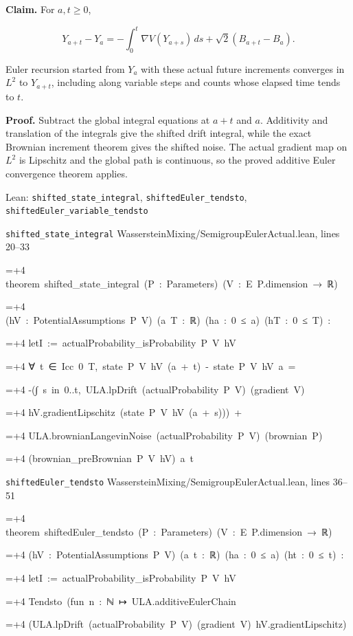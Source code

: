 \documentclass[11pt,a4paper]{report}
\newlength{\leancharwidth}
\newenvironment{leancode}{\par\smallskip\begingroup\ttfamily\footnotesize\raggedright
  \settowidth{\leancharwidth}{M}\setlength{\parskip}{0pt}\setlength{\parindent}{0pt}
  \frenchspacing}{\par\endgroup\smallskip}
\newcommand{\leanline}[2]{\hangindent=\dimexpr#1\leancharwidth+4\leancharwidth\relax
  \hangafter=1\noindent\hspace*{#1\leancharwidth}#2\par}
\newcommand{\leansource}[1]{\par{\footnotesize\color{leanmuted}#1}\par}
\begin{document}
\textbf{Claim.} For \(a,t\ge0\),

\[Y_{a+t}-Y_a=-\int_0^t\nabla V(Y_{a+s})\,ds+\sqrt2(B_{a+t}-B_a).\]

Euler recursion started from \(Y_a\) with these actual future increments converges in \(L^2\) to \(Y_{a+t}\), including along variable steps and counts whose elapsed time tends to \(t\).



\textbf{Proof.} Subtract the global integral equations at \(a+t\) and \(a\). Additivity and translation of the integrals give the shifted drift integral, while the exact Brownian increment theorem gives the shifted noise. The actual gradient map on \(L^2\) is Lipschitz and the global path is continuous, so the proved additive Euler convergence theorem applies.

\begin{leanbox}{Lean: \texttt{shifted\_\allowbreak{}state\_\allowbreak{}integral}, \texttt{shiftedEuler\_\allowbreak{}tendsto}, \texttt{shiftedEuler\_\allowbreak{}variable\_\allowbreak{}tendsto}}
\leansource{\texttt{shifted\_\allowbreak{}state\_\allowbreak{}integral} \quad WassersteinMixing/\allowbreak{}SemigroupEulerActual.lean, lines 20–33}
\begin{leancode}
\leanline{0}{theorem\ shifted\_state\_integral\ (P\ :\ Parameters)\ (V\ :\ E\ P.dimension\ →\ ℝ)}
\leanline{4}{(hV\ :\ PotentialAssumptions\ P\ V)\ (a\ T\ :\ ℝ)\ (ha\ :\ 0\ ≤\ a)\ (hT\ :\ 0\ ≤\ T)\ :}
\leanline{4}{letI\ :=\ actualProbability\_isProbability\ P\ V\ hV}
\leanline{4}{∀\ t\ ∈\ Icc\ 0\ T,\ state\ P\ V\ hV\ (a\ +\ t)\ -\ state\ P\ V\ hV\ a\ =}
\leanline{6}{-(∫\ s\ in\ 0..t,\ ULA.lpDrift\ (actualProbability\ P\ V)\ (gradient\ V)}
\leanline{8}{hV.gradientLipschitz\ (state\ P\ V\ hV\ (a\ +\ s)))\ +}
\leanline{6}{ULA.brownianLangevinNoise\ (actualProbability\ P\ V)\ (brownian\ P)}
\leanline{8}{(brownian\_preBrownian\ P\ V\ hV)\ a\ t}
\end{leancode}
\leansource{\texttt{shiftedEuler\_\allowbreak{}tendsto} \quad WassersteinMixing/\allowbreak{}SemigroupEulerActual.lean, lines 36–51}
\begin{leancode}
\leanline{0}{theorem\ shiftedEuler\_tendsto\ (P\ :\ Parameters)\ (V\ :\ E\ P.dimension\ →\ ℝ)}
\leanline{4}{(hV\ :\ PotentialAssumptions\ P\ V)\ (a\ t\ :\ ℝ)\ (ha\ :\ 0\ ≤\ a)\ (ht\ :\ 0\ ≤\ t)\ :}
\leanline{4}{letI\ :=\ actualProbability\_isProbability\ P\ V\ hV}
\leanline{4}{Tendsto\ (fun\ n\ :\ ℕ\ ↦\ ULA.additiveEulerChain}
\leanline{6}{(ULA.lpDrift\ (actualProbability\ P\ V)\ (gradient\ V)\ hV.gradientLipschitz)}

\end{leancode}
\end{leanbox}
\end{document}
